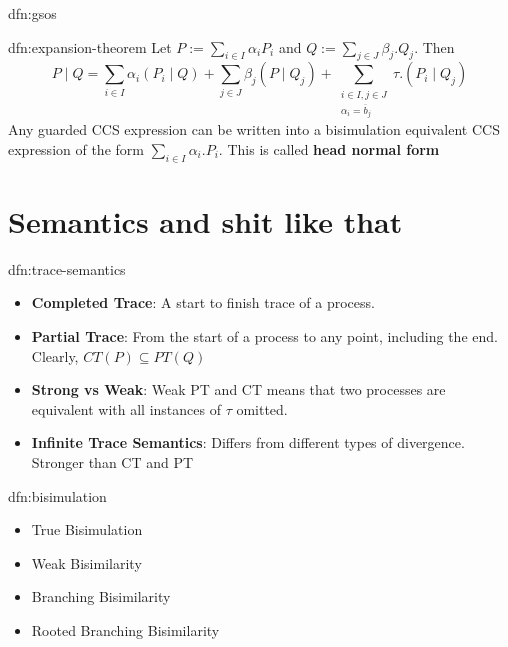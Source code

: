 \documentclass[landscape, 8pt]{extarticle}
\begin{document}
\begin{multicols}{3}
\begin{dfn}{dfn:gsos}{}
\end{dfn}

\begin{dfn}{dfn:expansion-theorem}{}
    Let $P := \sum_{i\in I} \alpha_{i} P_{i}$ and $Q := \sum_{j\in J} \beta_{j}. Q_{j}$. Then
    \[P \mid Q = \sum_{i\in I} \alpha_{i}(P_{i} \mid Q) + \sum_{j\in J} \beta_{j}(P \mid Q_{j}) + \sum_{\substack{i\in I, j\in J \\ \alpha_{i} = \overline{b}_{j}}} \tau.(P_{i} \mid Q_{j})\]
    Any guarded CCS expression can be written into a bisimulation equivalent CCS expression of the form $\sum_{i\in I} \alpha_{i}.P_{i}$. This is called \textbf{head normal form}
\end{dfn}

\newpage
\section{Semantics and shit like that}
\begin{dfn}{dfn:trace-semantics}{}
    \begin{itemize}
        \item \textbf{Completed Trace}: A start to finish trace of a process.
        \item \textbf{Partial Trace}: From the start of a process to any point, including the end. Clearly, $CT(P) \subseteq PT(Q)$
        \item \textbf{Strong vs Weak}: Weak PT and CT means that two processes are equivalent with all instances of $\tau$ omitted.
        \item \textbf{Infinite Trace Semantics}: Differs from different types of divergence. Stronger than CT and PT
    \end{itemize}
\end{dfn}

\begin{dfn}{dfn:bisimulation}{}
    \begin{itemize}
        \item True Bisimulation
        \item Weak Bisimilarity
        \item Branching Bisimilarity
        \item Rooted Branching Bisimilarity
    \end{itemize}    
\end{dfn}


\end{multicols}
\end{document}
